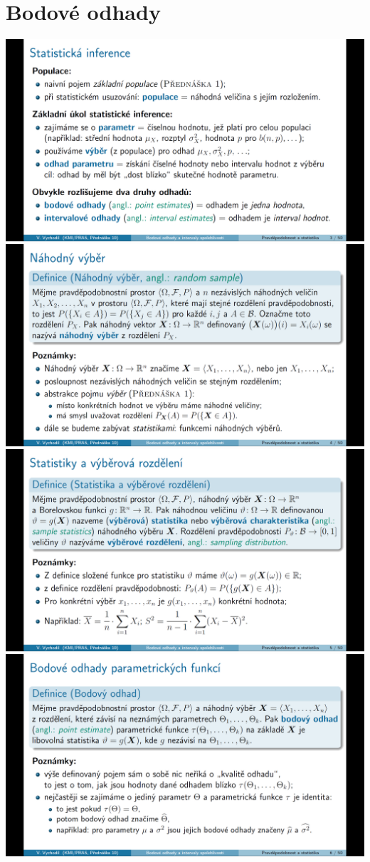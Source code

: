 \documentclass[12pt,a4paper]{article}
\begin{document}
\section{Bodové odhady}
\begin{center}
	\includegraphics[scale=0.32]{img/bodove_odhady_1}
	\includegraphics[scale=0.32]{img/bodove_odhady_2}
	\includegraphics[scale=0.32]{img/bodove_odhady_3}
	\includegraphics[scale=0.32]{img/bodove_odhady_4}

\end{center}
\end{document}
